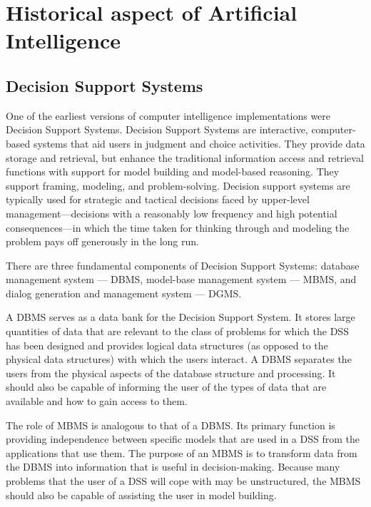 
\section{Historical aspect of Artificial Intelligence}

\subsection{Decision Support Systems} 

One of the earliest versions of computer intelligence implementations were Decision Support Systems.
Decision Support Systems are interactive, computer-based systems that aid users in judgment and choice activities.
They provide data storage and retrieval, but enhance the traditional information access and retrieval functions with support for model building and model-based reasoning.
They support framing, modeling, and problem-solving.
Decision support systems are typically used for strategic and tactical decisions faced by upper-level management—decisions with a reasonably low frequency and high potential consequences—in which the time taken for thinking through and modeling the problem pays off generously in the long run.
\cite{decision_support_systems_article}

There are three fundamental components of Decision Support Systems: database management system — DBMS, model-base management system — MBMS, and dialog generation and management system — DGMS.
\cite{decision_support_systems_engineering}

A DBMS serves as a data bank for the Decision Support System. 
It stores large quantities of data that are relevant to the class of problems for which the DSS has been designed and provides logical data structures (as opposed to the physical data structures) with which the users interact. 
A DBMS separates the users from the physical aspects of the database structure and processing. 
It should also be capable of informing the user of the types of data that are available and how to gain access to them.

The role of MBMS is analogous to that of a DBMS. 
Its primary function is providing independence between specific models that are used in a DSS from the applications that use them. 
The purpose of an MBMS is to transform data from the DBMS into information that is useful in decision-making. 
Because many problems that the user of a DSS will cope with may be unstructured, the MBMS should also be capable of assisting the user in model building.


